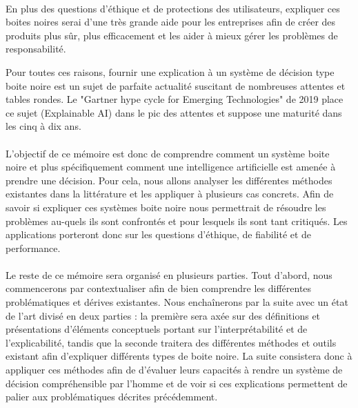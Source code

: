 \paragraph{}En plus des questions d'éthique et de protections des utilisateurs, expliquer ces boites noires serai d'une très grande aide pour les entreprises afin de créer des produits plus sûr, plus efficacement et les aider à mieux gérer les problèmes de responsabilité.\par
Pour toutes ces raisons, fournir une explication à un système de décision type boite noire est un sujet de parfaite actualité suscitant de nombreuses attentes et tables rondes. Le "Gartner hype cycle for Emerging Technologies" de 2019 place ce sujet (Explainable AI) dans le pic des attentes et suppose une maturité dans les cinq à dix ans.

\paragraph{}L’objectif de ce mémoire est donc de comprendre comment un système boite noire et plus spécifiquement comment une intelligence artificielle est amenée à prendre une décision. Pour cela, nous allons analyser les différentes méthodes existantes dans la littérature et les appliquer à plusieurs cas concrets. Afin de savoir si expliquer ces systèmes boite noire nous permettrait de résoudre les problèmes au-quels ils sont confrontés et pour lesquels ils sont tant critiqués. Les applications porteront donc sur les questions d'éthique, de fiabilité et de performance.\\

\paragraph{}Le reste de ce mémoire sera organisé en plusieurs parties. Tout d'abord, nous commencerons par contextualiser afin de bien comprendre les différentes problématiques et dérives existantes. Nous enchaînerons par la suite avec un état de l'art divisé en deux parties : la première sera axée sur des définitions et présentations d'éléments conceptuels portant sur l'interprétabilité et de l'explicabilité, tandis que la seconde traitera des différentes méthodes et outils existant afin d'expliquer différents types de boite noire. La suite consistera donc à appliquer ces méthodes afin de d'évaluer leurs capacités à rendre un système de décision compréhensible par l'homme et de voir si ces explications permettent de palier aux problématiques décrites précédemment.

